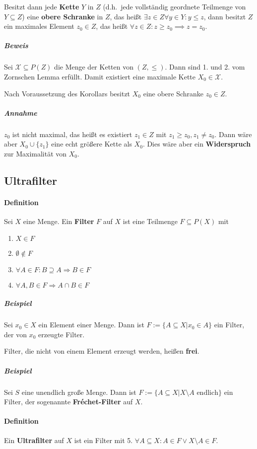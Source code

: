 \documentclass[14pt,a4paper]{article}
\begin{document}
  Besitzt dann jede \textbf{Kette} $Y$ in $Z$ (d.h.\ jede vollständig geordnete Teilmenge
  von $Y \subseteq Z$) eine \textbf{obere Schranke} in $Z$, das heißt $\exists z
  \in Z \forall y \in Y : y \leq z$, dann besitzt $Z$ ein maximales Element $z_0
  \in Z$, das heißt $\forall z \in Z : z \geq z_0 \implies z = z_0$.

  \subparagraph{Beweis}
  Sei $\mathscr{X} \subseteq P(Z)$ die Menge der Ketten von $(Z, \leq)$.
  Dann sind 1. und 2. vom Zornschen Lemma erfüllt.
  Damit existiert eine maximale Kette $X_0 \in \mathscr{X}$.

  Nach Voraussetzung des Korollars besitzt $X_0$ eine obere Schranke $z_0 \in
  Z$.

  \subparagraph{Annahme}
  $z_0$ ist nicht maximal, das heißt es existiert  $z_1 \in Z$ mit $z_1 \geq
  z_0, z_1 \neq z_0$.
  Dann wäre aber $X_0 \cup \{z_1\}$ eine echt größere Kette als $X_0$.
  Dies wäre aber ein \textbf{Widerspruch} zur Maximalität von $X_0$.

  \subsection{Ultrafilter}
  \paragraph{Definition}
  Sei $X$ eine Menge. Ein \textbf{Filter} $F$ auf $X$ ist eine Teilmenge $F
  \subseteq P(X)$ mit
  \begin{enumerate}
  \item $X \in F$
  \item $\emptyset \notin F$
  \item $\forall A \in F : B \supseteq A \Rightarrow B \in F$
  \item $\forall A,B \in F \Rightarrow A \cap B \in F$
  \end{enumerate}

  \subparagraph{Beispiel}
  Sei $x_0 \in X$ ein Element einer Menge.
  Dann ist $F := \{ A \subseteq X | x_0 \in A\}$ ein Filter, der von $x_0$ erzeugte Filter.

  Filter, die nicht von einem Element erzeugt werden, heißen \textbf{frei}.

	\subparagraph{Beispiel}
		Sei $S$ eine unendlich große Menge.
		Dann ist $F := \{A \subseteq X | X \setminus A \text{ endlich} \}$ ein Filter, der sogenannte \textbf{Fréchet-Filter} auf $X$.
		

	\paragraph{Definition}
		Ein \textbf{Ultrafilter} auf $X$ ist ein Filter mit 5. $\forall A \subseteq X : A \in F \lor X \setminus A \in F$.
		
\end{document}
